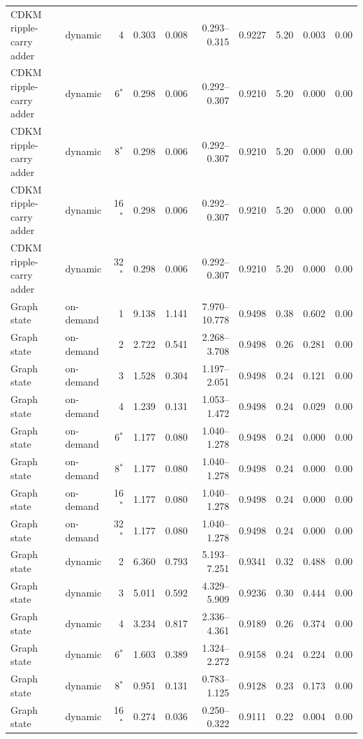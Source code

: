 {\begin{longtable}{@{}llrrrrrrrr@{}}
CDKM ripple-carry adder & dynamic & 4 & 0.303 & 0.008 & 0.293--0.315 & 0.9227 & 5.20 & 0.003 & 0.00 \\
CDKM ripple-carry adder & dynamic & 6$^*$ & 0.298 & 0.006 & 0.292--0.307 & 0.9210 & 5.20 & 0.000 & 0.00 \\
CDKM ripple-carry adder & dynamic & 8$^*$ & 0.298 & 0.006 & 0.292--0.307 & 0.9210 & 5.20 & 0.000 & 0.00 \\
CDKM ripple-carry adder & dynamic & 16$^*$ & 0.298 & 0.006 & 0.292--0.307 & 0.9210 & 5.20 & 0.000 & 0.00 \\
CDKM ripple-carry adder & dynamic & 32$^*$ & 0.298 & 0.006 & 0.292--0.307 & 0.9210 & 5.20 & 0.000 & 0.00 \\
Graph state & on-demand & 1 & 9.138 & 1.141 & 7.970--10.778 & 0.9498 & 0.38 & 0.602 & 0.00 \\
Graph state & on-demand & 2 & 2.722 & 0.541 & 2.268--3.708 & 0.9498 & 0.26 & 0.281 & 0.00 \\
Graph state & on-demand & 3 & 1.528 & 0.304 & 1.197--2.051 & 0.9498 & 0.24 & 0.121 & 0.00 \\
Graph state & on-demand & 4 & 1.239 & 0.131 & 1.053--1.472 & 0.9498 & 0.24 & 0.029 & 0.00 \\
Graph state & on-demand & 6$^*$ & 1.177 & 0.080 & 1.040--1.278 & 0.9498 & 0.24 & 0.000 & 0.00 \\
Graph state & on-demand & 8$^*$ & 1.177 & 0.080 & 1.040--1.278 & 0.9498 & 0.24 & 0.000 & 0.00 \\
Graph state & on-demand & 16$^*$ & 1.177 & 0.080 & 1.040--1.278 & 0.9498 & 0.24 & 0.000 & 0.00 \\
Graph state & on-demand & 32$^*$ & 1.177 & 0.080 & 1.040--1.278 & 0.9498 & 0.24 & 0.000 & 0.00 \\
Graph state & dynamic & 2 & 6.360 & 0.793 & 5.193--7.251 & 0.9341 & 0.32 & 0.488 & 0.00 \\
Graph state & dynamic & 3 & 5.011 & 0.592 & 4.329--5.909 & 0.9236 & 0.30 & 0.444 & 0.00 \\
Graph state & dynamic & 4 & 3.234 & 0.817 & 2.336--4.361 & 0.9189 & 0.26 & 0.374 & 0.00 \\
Graph state & dynamic & 6$^*$ & 1.603 & 0.389 & 1.324--2.272 & 0.9158 & 0.24 & 0.224 & 0.00 \\
Graph state & dynamic & 8$^*$ & 0.951 & 0.131 & 0.783--1.125 & 0.9128 & 0.23 & 0.173 & 0.00 \\
Graph state & dynamic & 16$^*$ & 0.274 & 0.036 & 0.250--0.322 & 0.9111 & 0.22 & 0.004 & 0.00 \\

\end{longtable}}
